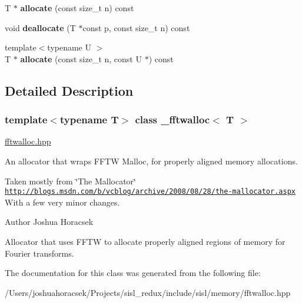 \begin{DoxyCompactItemize}
\mbox{\label{class__fftwalloc_a97598b788bd8462c9719b2847575b4d5}} 
T $\ast$ {\bfseries allocate} (const size\+\_\+t n) const
\item 
\mbox{\label{class__fftwalloc_a36bada8dcbe796997e9c905c6a405c92}} 
void {\bfseries deallocate} (T $\ast$const p, const size\+\_\+t n) const
\item 
\mbox{\label{class__fftwalloc_ad95103db3b0f655ec474b86feb2d3034}} 
{\footnotesize template$<$typename U $>$ }\\T $\ast$ {\bfseries allocate} (const size\+\_\+t n, const U $\ast$) const
\end{DoxyCompactItemize}


\subsection{Detailed Description}
\subsubsection*{template$<$typename T$>$\newline
class \+\_\+fftwalloc$<$ T $>$}

\hyperlink{fftwalloc_8hpp_source}{fftwalloc.\+hpp}

An allocator that wraps F\+F\+TW Malloc, for properly aligned memory allocations.

Taken mostly from \char`\"{}\+The Mallocator\char`\"{} \href{http://blogs.msdn.com/b/vcblog/archive/2008/08/28/the-mallocator.aspx}{\tt http\+://blogs.\+msdn.\+com/b/vcblog/archive/2008/08/28/the-\/mallocator.\+aspx} With a few very minor changes.

\begin{DoxyAuthor}{Author}
Joshua Horacsek
\end{DoxyAuthor}
Allocator that uses F\+F\+TW to allocate properly aligned regions of memory for Fourier transforms. 

The documentation for this class was generated from the following file\+:\begin{DoxyCompactItemize}
\item 
/\+Users/joshuahoracsek/\+Projects/sisl\+\_\+redux/include/sisl/memory/fftwalloc.\+hpp\end{DoxyCompactItemize}
